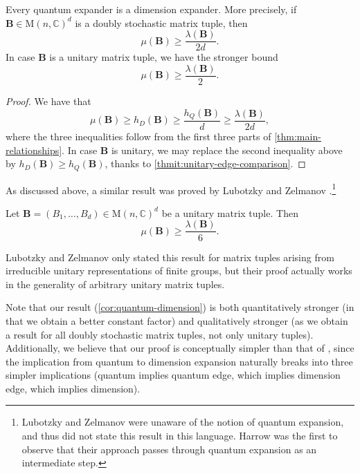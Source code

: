 \documentclass{toc}
\theoremstyle{plain}
\numberwithin{equation}{section}
\theoremstyle{definition}
\newcommand{\bC}{\mathbb{C}}
\newcommand{\M}{\mathrm{M}}
\newcommand{\tuple}[1]{\mathbf{#1}}
\newcommand{\vB}{\tuple{B}}
\begin{document}
\begin{corollary}\label{cor:quantum-dimension}
    Every quantum expander is a dimension expander. More precisely, if $\vB \in \M(n,\bC)^d$ is a doubly stochastic matrix tuple, then
    \[
        \mu(\vB) \geq  \frac{\lambda(\vB)}{2d}.
    \]
    In case $\vB$ is a unitary matrix tuple, we have the stronger bound
    \[
        \mu(\vB) \geq  \frac{\lambda(\vB)}{2}.
    \]
\end{corollary}
\begin{proof}
    We have that
    \[
        \mu(\vB) \geq  h_D(\vB) \geq  \frac{h_Q(\vB)}{d} \geq  \frac{\lambda(\vB)}{2d},
    \]
    where the three inequalities follow from the first three parts of \cref{thm:main-relationships}. In case $\vB$ is unitary, we may replace the second inequality above by $h_D(\vB) \geq  h_Q(\vB)$, thanks to \cref{thmit:unitary-edge-comparison}.
\end{proof}

As discussed above, a similar result was proved by Lubotzky and Zelmanov \cite{LUBOTZKY2008730}.\footnote{Lubotzky and Zelmanov were unaware of the notion of quantum expansion, and thus did not state this result in this language. Harrow \cite{Harrow08} was the first to observe that their approach passes through quantum expansion as an intermediate step.}
\begin{theorem}\label{thm:LZ}
    Let $\vB=(B_1,\dots,B_d)\in\mathrm{M}(n,\bC)^d$ be a unitary matrix tuple. Then
    $$\mu(\vB) \geq \frac{\lambda(\vB)}{6}.$$
\end{theorem}
Lubotzky and Zelmanov only stated this result for matrix tuples arising from irreducible unitary representations of finite groups, but their proof actually works in the generality of arbitrary unitary matrix tuples. 

Note that our result (\cref{cor:quantum-dimension}) is both quantitatively stronger (in that we obtain a better constant factor) and qualitatively stronger (as we obtain a result for all doubly stochastic matrix tuples, not only unitary tuples). Additionally, we believe that our proof is conceptually simpler than that of \cite{LUBOTZKY2008730}, since the implication from quantum to dimension expansion naturally breaks into three simpler implications (quantum implies quantum edge, which implies dimension edge, which implies dimension).
\end{document}
